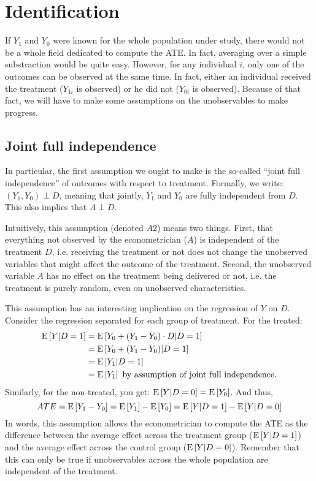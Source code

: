 \section{Identification}

If $Y_1$ and $Y_0$ were known for the whole population under study, there would not be a whole field dedicated to compute the ATE. In fact, averaging over a simple substraction would be quite easy. However, for any individual $i$, only one of the outcomes can be observed at the same time. In fact, either an individual received the treatment ($Y_{1i}$ is observed) or he did not ($Y_{0i}$ is observed). Because of that fact, we will have to make some assumptions on the unobservables to make progress.

\subsection{Joint full independence}

In particular, the first assumption we ought to make is the so-called ``joint full independence'' of outcomes with respect to treatment. Formally, we write: $(Y_1, Y_0)\perp D$, meaning that jointly, $Y_1$ and $Y_0$ are fully independent from $D$. This also implies that $A\perp D$.

Intuitively, this assumption (denoted $A2$) means two things. First, that everything not observed by the econometrician ($A$) is independent of the treatment $D$, i.e. receiving the treatment or not does not change the unobserved variables that might affect the outcome of the treatment. Second, the unobserved variable $A$ has no effect on the treatment being delivered or not, i.e. the treatment is purely random, even on unobserved characteristics.

This assumption has an interesting implication on the regression of $Y$ on $D$. Consider the regression separated for each group of treatment. For the treated: \begin{align*}
\operatorname{E}\left[Y\vert D =1\right] & = \operatorname{E}\left[Y_0 + (Y_1 - Y_0)\cdot D\vert D = 1\right] \\ & = \operatorname{E}\left[Y_0 + (Y_1 - Y_0) \vert D = 1\right]  \\ & = \operatorname{E}\left[Y_1 \vert D = 1\right]  \\ & = \operatorname{E}\left[Y_1\right] \text{ by assumption of joint full independence.}
\end{align*} Similarly, for the non-treated, you get: $\operatorname{E}\left[Y\vert D = 0\right] = \operatorname{E}\left[Y_0\right] $. And thus, $$ ATE = \operatorname{E}\left[Y_1 - Y_0\right] = \operatorname{E}\left[Y_1\right] - \operatorname{E}\left[Y_0\right] = \operatorname{E}\left[Y\vert D =1\right] - \operatorname{E}\left[Y\vert D = 0\right] $$ In words, this assumption allows the econometrician to compute the ATE as the difference between the average effect across the treatment group ($\operatorname{E}\left[Y\vert D =1\right]$) and the average effect across the control group ($\operatorname{E}\left[Y\vert D =0\right]$). Remember that this can only be true if unobservables across the whole population are independent of the treatment.

